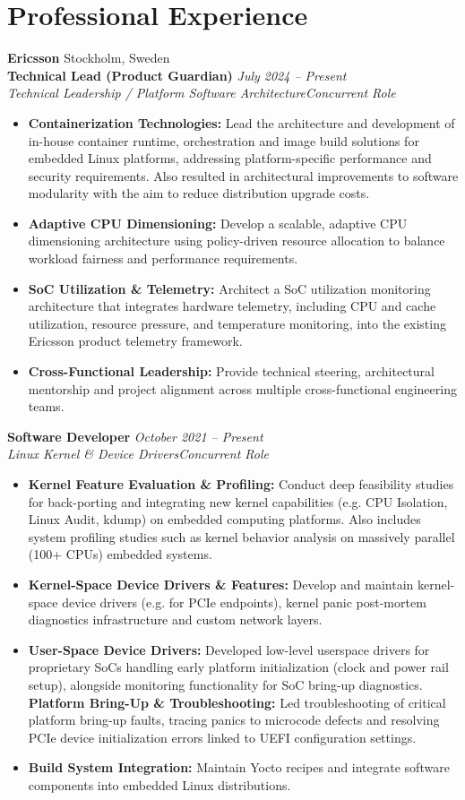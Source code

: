 \documentclass[10pt,a4paper]{article}
\newcommand{\job}[4]{\textbf{#1} \hfill \textit{#2}\\\textit{\color{secondary}#3}\hfill\textit{\color{secondary}#4}\vspace{-2pt}}
\begin{document}
\section{Professional Experience}
\textbf{Ericsson} \hfill Stockholm, Sweden\\
\job{Technical Lead (Product Guardian)}{July 2024 -- Present}{Technical Leadership / Platform Software Architecture}{Concurrent Role}
\begin{itemize}
\item \textbf{Containerization Technologies:} Lead the architecture and development of in-house container runtime, orchestration and image build solutions for embedded Linux platforms, addressing platform-specific performance and security requirements. Also resulted in architectural improvements to software modularity with the aim to reduce distribution upgrade costs.
\item \textbf{Adaptive CPU Dimensioning:} Develop a scalable, adaptive CPU dimensioning architecture using policy-driven resource allocation to balance workload fairness and performance requirements.
\item \textbf{SoC Utilization \& Telemetry:} Architect a SoC utilization monitoring architecture that integrates hardware telemetry, including CPU and cache utilization, resource pressure, and temperature monitoring, into the existing Ericsson product telemetry framework.
\item \textbf{Cross-Functional Leadership:} Provide technical steering, architectural mentorship and project alignment across multiple cross-functional engineering teams.
\end{itemize}
\vspace{5pt}
\job{Software Developer}{October 2021 -- Present}{Linux Kernel \& Device Drivers}{Concurrent Role}
\begin{itemize}
\item \textbf{Kernel Feature Evaluation \& Profiling:} Conduct deep feasibility studies for back-porting and integrating new kernel capabilities (e.g. CPU Isolation, Linux Audit, kdump) on embedded computing platforms. Also includes system profiling studies such as kernel behavior analysis on massively parallel (100+ CPUs) embedded systems.
\item \textbf{Kernel-Space Device Drivers \& Features:} Develop and maintain kernel-space device drivers (e.g. for PCIe endpoints), kernel panic post-mortem diagnostics infrastructure and custom network layers.
\item \textbf{User-Space Device Drivers:} Developed low-level userspace drivers for proprietary SoCs handling early platform initialization (clock and power rail setup), alongside monitoring functionality for SoC bring-up diagnostics.
\textbf{Platform Bring-Up \& Troubleshooting:} Led troubleshooting of critical platform bring-up faults, tracing panics to microcode defects and resolving PCIe device initialization errors linked to UEFI configuration settings.
\item \textbf{Build System Integration:} Maintain Yocto recipes and integrate software components into embedded Linux distributions.
\end{itemize}
\end{document}
